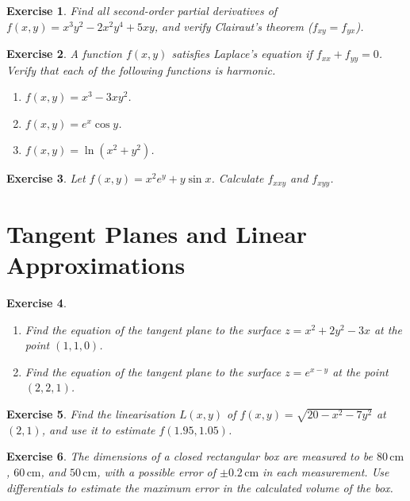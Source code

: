 \documentclass[12pt,a4paper]{article}
\theoremstyle{exercise}
\newtheorem{exercise}{Exercise}[section]
\theoremstyle{hint}
\begin{document}
\begin{exercise}
Find all second-order partial derivatives of
$f(x,y)=x^{3}y^{2}-2x^{2}y^{4}+5xy$, and verify Clairaut's theorem
($f_{xy}=f_{yx}$).
\end{exercise}

\begin{exercise}
A function $f(x,y)$ satisfies Laplace's equation if
$f_{xx}+f_{yy}=0$.  Verify that each of the following functions is
harmonic.
\begin{enumerate}[label=(\alph*)]
  \item $f(x,y)=x^{3}-3xy^{2}$.
  \item $f(x,y)=e^{x}\cos y$.
  \item $f(x,y)=\ln(x^{2}+y^{2})$.
\end{enumerate}
\end{exercise}

\begin{exercise}
Let $f(x,y)=x^{2}e^{y}+y\sin x$.  Calculate $f_{xxy}$ and $f_{xyy}$.
\end{exercise}

\section{Tangent Planes and Linear Approximations}

\begin{exercise}
\begin{enumerate}[label=(\alph*)]
  \item Find the equation of the tangent plane to the surface
        $z=x^{2}+2y^{2}-3x$ at the point $(1,1,0)$.
  \item Find the equation of the tangent plane to the surface
        $z=e^{x-y}$ at the point $(2,2,1)$.
\end{enumerate}
\end{exercise}

\begin{exercise}
Find the linearisation $L(x,y)$ of $f(x,y)=\sqrt{20-x^{2}-7y^{2}}$
at $(2,1)$, and use it to estimate $f(1.95,1.05)$.
\end{exercise}

\begin{exercise}
The dimensions of a closed rectangular box are measured to be
$80\,\text{cm}$, $60\,\text{cm}$, and $50\,\text{cm}$, with a possible
error of $\pm 0.2\,\text{cm}$ in each measurement.  Use differentials
to estimate the maximum error in the calculated volume of the box.
\end{exercise}
\end{document}
